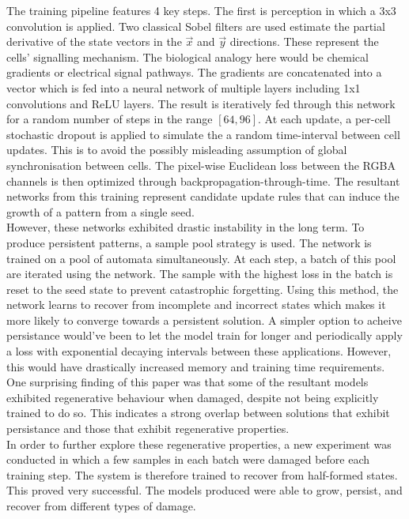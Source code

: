 The training pipeline features 4 key steps.
The first is perception in which a 3x3 convolution is applied.
Two classical Sobel filters are used estimate the partial derivative of the state vectors in the $\overrightarrow{x}$ and $\overrightarrow{y}$ directions.
These represent the cells' signalling mechanism.
The biological analogy here would be chemical gradients or electrical signal pathways.
The gradients are concatenated into a vector which is fed into a neural network of multiple layers including 1x1 convolutions and ReLU layers.
The result is iteratively fed through this network for a random number of steps in the range $[64, 96]$.
At each update, a per-cell stochastic dropout is applied to simulate the a random time-interval between cell updates.
This is to avoid the possibly misleading assumption of global synchronisation between cells.
The pixel-wise Euclidean loss between the RGBA channels is then optimized through backpropagation-through-time. The resultant networks from this training represent candidate update rules that can induce the growth of a pattern from a single seed.\\

However, these networks exhibited drastic instability in the long term.
To produce persistent patterns, a sample pool strategy is used. 
The network is trained on a pool of automata simultaneously.
At each step, a batch of this pool are iterated using the network.
The sample with the highest loss in the batch is reset to the seed state to prevent catastrophic forgetting. 
Using this method, the network learns to recover from incomplete and incorrect states which makes it more likely to converge towards a persistent solution.
A simpler option to acheive persistance would've been to let the model train for longer and periodically apply a loss with exponential decaying intervals between these applications.
However, this would have drastically increased memory and training time requirements.\\

One surprising finding of this paper was that some of the resultant models exhibited regenerative behaviour when damaged, despite not being explicitly trained to do so. 
This indicates a strong overlap between solutions that exhibit persistance and those that exhibit regenerative properties.\\

In order to further explore these regenerative properties, a new experiment was conducted in which a few samples in each batch were damaged before each training step. 
The system is therefore trained to recover from half-formed states.
This proved very successful. The models produced were able to grow, persist, and recover from different types of damage.\\

